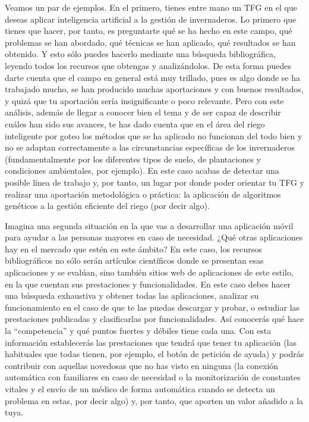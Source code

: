 Veamos un par de ejemplos. En el primero, tienes entre mano un TFG en el que deseas aplicar inteligencia artificial a la gestión de invernaderos. Lo primero que tienes que hacer, por tanto, es preguntarte qué se ha hecho en este campo, qué problemas se han abordado, qué técnicas se han aplicado, qué resultados se han obtenido. Y esto sólo puedes hacerlo mediante una búsqueda bibliográfica, leyendo todos los recursos que obtengas y analizándolos. De esta forma puedes darte cuenta que el campo en general está muy trillado, pues es algo donde se ha trabajado mucho, se han producido muchas aportaciones y con buenos resultados, y quizá que tu aportación sería insignificante o poco relevante. Pero con este análisis, además de llegar a conocer bien el tema y de ser capaz de describir cuáles han sido sus avances, te has dado cuenta que en el área del riego inteligente por goteo los métodos que se ha aplicado no funcionan del todo bien y no se adaptan correctamente a las circunstancias específicas de los invernaderos (fundamentalmente por los diferentes tipos de suelo, de plantaciones y condiciones ambientales, por ejemplo). En este caso acabas de detectar una posible línea de trabajo y, por tanto, un lugar por donde poder orientar tu TFG y realizar una aportación metodológica o práctica: la aplicación de algoritmos genéticos a la gestión eficiente del riego (por decir algo). 

Imagina una segunda situación en la que vas a desarrollar una aplicación móvil para ayudar a las personas mayores en caso de necesidad. ¿Qué otras aplicaciones hay en el mercado que estén en este ámbito? En este caso, los recursos bibliográficos no sólo serán artículos científicos donde se presentan esas aplicaciones y se evalúan, sino también  sitios web de aplicaciones de este estilo, en la que cuentan sus prestaciones y funcionalidades. En este caso debes hacer una búsqueda exhaustiva y obtener todas las aplicaciones, analizar su funcionamiento en el caso de que te las puedas descargar y probar, o estudiar las prestaciones publicadas y clasificarlas por funcionalidades. Así conocerás qué hace la ``competencia'' y qué puntos fuertes y débiles tiene cada una. Con esta información establecerás las prestaciones que tendrá que tener tu aplicación (las habituales que todas tienen, por ejemplo, el botón de petición de ayuda) y podrás contribuir con aquellas novedosas que no has visto en ninguna (la conexión automática con familiares en caso de necesidad o la monitorización de constantes vitales y el envío de un médico de forma automática cuando se detecta un problema en estas, por decir algo) y, por tanto, que aporten un valor añadido a la tuya.


